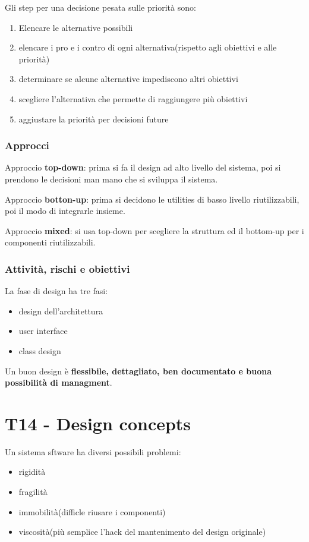 \documentclass{article}
\begin{document}
Gli step per una decisione pesata sulle priorità sono:
\begin{enumerate}
    \item Elencare le alternative possibili
    \item elencare i pro e i contro di ogni alternativa(rispetto agli obiettivi e alle priorità)
    \item determinare se alcune alternative impediscono altri obiettivi
    \item scegliere l'alternativa che permette di raggiungere più obiettivi
    \item aggiustare la priorità per decisioni future
\end{enumerate}

\subsubsection{Approcci}
Approccio \textbf{top-down}: prima si fa il design ad alto livello del sistema,
poi si prendono le decisioni man mano che si sviluppa il sistema.


Approccio \textbf{botton-up}: prima si decidono le utilities di basso livello riutilizzabili,
poi il modo di integrarle insieme.


Approccio \textbf{mixed}: si usa top-down per scegliere la struttura ed 
il bottom-up per i componenti riutilizzabili.

\subsubsection{Attività, rischi e obiettivi}

La fase di design ha tre fasi:
\begin{itemize}
    \item design dell'architettura
    \item user interface
    \item class design
\end{itemize}

Un buon design è \textbf{flessibile, dettagliato, ben documentato e buona possibilità di managment}.

\section{T14 - Design concepts}

Un sistema sftware ha diversi possibili problemi:
\begin{itemize}
    \item rigidità
    \item fragilità
    \item immobilità(difficle riusare i componenti)
    \item viscosità(più semplice l'hack del mantenimento del design originale)
\end{itemize}
\end{document}
